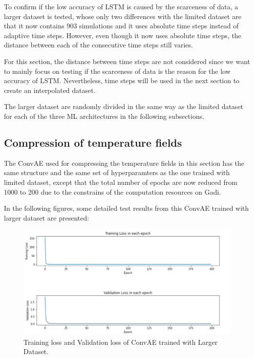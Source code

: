 To confirm if the low accuracy of LSTM is caused by the scarceness of data, a larger dataset is tested, whose only two differences with the limited dataset are that it now contains 903 simulations and it uses absolute time steps instead of adaptive time steps. However, even though it now uses absolute time steps, the distance between each of the consecutive time steps still varies.

For this section, the distance between time steps are not considered since we want to mainly focus on testing if the scarceness of data is the reason for the low accuracy of LSTM. Nevertheless, time steps will be used in the next section to create an interpolated dataset.

The larger dataset are randomly divided in the same way as the limited dataset for each of the three ML architectures in the following subsections.

\subsection{Compression of temperature fields}

The ConvAE used for compressing the temperature fields in this section has the same structure and the same set of hyperparamters as the one trained with limited dataset, except that the total number of epochs are now reduced from 1000 to 200 due to the constrains of the computation resources on Gadi.

In the following figures, some detailed test results from this ConvAE trained with larger dataset are presented:

\begin{figure}[H]
    \caption{Training loss and Validation loss of ConvAE trained with Larger Dataset.}
    \includegraphics[scale=0.6]{figures/mantle_convection_images/larger_dataset/ConvAE_trainingData.png}
\end{figure}

